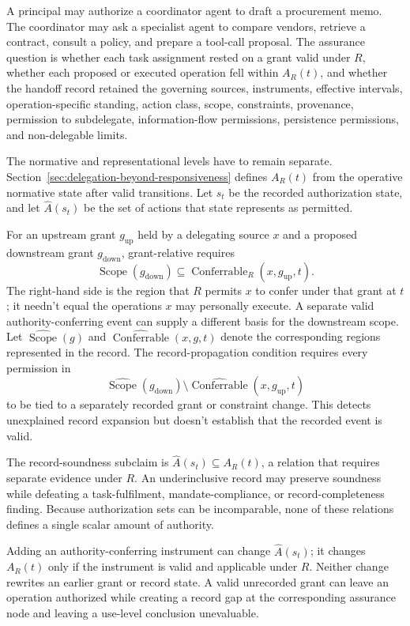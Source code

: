 A principal may authorize a coordinator agent to draft a procurement memo. The coordinator may ask a specialist agent to compare vendors, retrieve a contract, consult a policy, and prepare a tool-call proposal. The assurance question is whether each task assignment rested on a grant valid under \(R\), whether each proposed or executed operation fell within \(A_R(t)\), and whether the handoff record retained the governing sources, instruments, effective intervals, operation-specific standing, action class, scope, constraints, provenance, permission to subdelegate, information-flow permissions, persistence permissions, and non-delegable limits.

The normative and representational levels have to remain separate. Section~\ref{sec:delegation-beyond-responsiveness} defines \(A_R(t)\) from the operative normative state after valid transitions. Let \(s_t\) be the recorded authorization state, and let \(\widehat{A}(s_t)\) be the set of actions that state represents as permitted.

For an upstream grant \(g_{\mathrm{up}}\) held by a delegating source \(x\) and a proposed downstream grant \(g_{\mathrm{down}}\), grant-relative  requires
\[
  \operatorname{Scope}(g_{\mathrm{down}})
  \subseteq
  \operatorname{Conferrable}_{R}(x,g_{\mathrm{up}},t).
\]
The right-hand side is the region that \(R\) permits \(x\) to confer under that grant at \(t\); it needn't equal the operations \(x\) may personally execute. A separate valid authority-conferring event can supply a different basis for the downstream scope. Let \(\widehat{\operatorname{Scope}}(g)\) and \(\widehat{\operatorname{Conferrable}}(x,g,t)\) denote the corresponding regions represented in the record. The record-propagation condition requires every permission in
\[
  \widehat{\operatorname{Scope}}(g_{\mathrm{down}})
  \setminus
  \widehat{\operatorname{Conferrable}}(x,g_{\mathrm{up}},t)
\]
to be tied to a separately recorded grant or constraint change. This detects unexplained record expansion but doesn't establish that the recorded event is valid.

The record-soundness subclaim is \(\widehat{A}(s_t) \subseteq A_R(t)\), a relation that requires separate evidence under \(R\). An underinclusive record may preserve soundness while defeating a task-fulfilment, mandate-compliance, or record-completeness finding. Because authorization sets can be incomparable, none of these relations defines a single scalar amount of authority.

Adding an authority-conferring instrument can change \(\widehat{A}(s_t)\); it changes \(A_R(t)\) only if the instrument is valid and applicable under \(R\). Neither change rewrites an earlier grant or record state. A valid unrecorded grant can leave an operation authorized while creating a record gap at the corresponding assurance node and leaving a use-level conclusion unevaluable.

